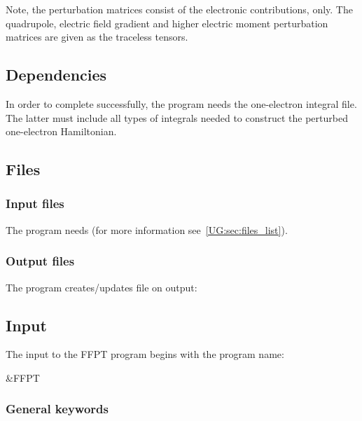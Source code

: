 Note, the perturbation matrices consist of the electronic contributions,
only. The quadrupole, electric field gradient and higher electric moment
perturbation matrices are given as the traceless tensors.


\subsection{Dependencies}
\label{UG:sec:ffpt_dependencies}
In order to complete successfully, the program  needs
the one-electron integral file. The latter must include all types
of integrals needed to construct the perturbed one-electron
Hamiltonian.

\subsection{Files}
\label{UG:sec:ffpt_files}

\subsubsection{Input files}
The program  needs 
(for more information see~\ref{UG:sec:files_list}).


\subsubsection{Output files}
The program  creates/updates file  on output:

\subsection{Input}
\label{UG:sec:ffpt_input}

The input to the {\prgmfont FFPT} program begins with the program name:
\begin{inputlisting}
 &FFPT
\end{inputlisting}


\subsubsection{General keywords}

